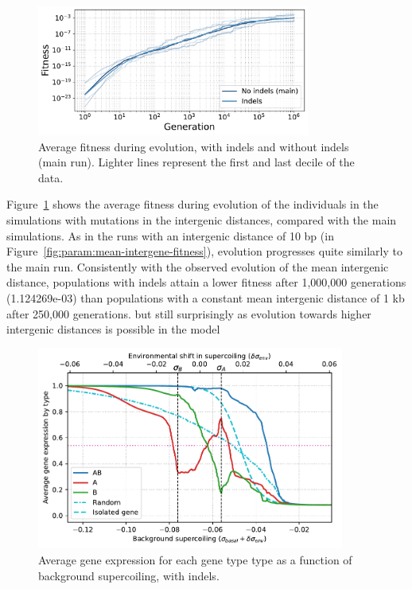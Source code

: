 \begin{figure}[H]
\centering
  \includegraphics[width=0.8\textwidth]{param/evolve-intergene/fitness_all_with_main.pdf}
\caption[Average fitness during evolution, with indels]{Average fitness during evolution, with indels and without indels (main run).
Lighter lines represent the first and last decile of the data.}
\label{fig:param:evolve-intergene-fitness}
\end{figure}

Figure~\ref{fig:param:evolve-intergene-fitness} shows the average fitness during evolution of the individuals in the simulations with mutations in the intergenic distances, compared with the main simulations.
As in the runs with an intergenic distance of 10 bp (in Figure~\ref{fig:param:mean-intergene-fitness}), evolution progresses quite similarly to the main run.
Consistently with the observed evolution of the mean intergenic distance, populations with indels attain a lower fitness after 1,000,000 generations (1.124269e-03) than populations with a constant mean intergenic distance of 1 kb after 250,000 generations.
but still surprisingly as evolution towards higher intergenic distances is possible in the model

\begin{figure}[H]
\centering
\includegraphics[width=0.9\textwidth]{param/evolve-intergene/activity_sigmas_avg.pdf}
\caption[Average gene expression as a function of background supercoiling, with indels]{Average gene expression for each gene type type as a function of background supercoiling, with indels.}
\label{fig:param:evolve-intergene-activ-by-sigma}
\end{figure}

